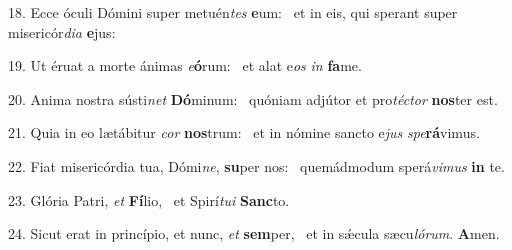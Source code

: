 18. Ecce óculi Dómini super metuén\textit{tes} \textbf{e}um: \ast\  et in eis, qui sperant super misericór\textit{di}\textit{a} \textbf{e}jus:\

19. Ut éruat a morte ánimas \textit{e}\textbf{ó}rum: \ast\  et alat e\textit{os} \textit{in} \textbf{fa}me.\

20. Anima nostra sústi\textit{net} \textbf{Dó}minum: \ast\  quóniam adjútor et pro\textit{téc}\textit{tor} \textbf{nos}ter est.\

21. Quia in eo lætábitur \textit{cor} \textbf{nos}trum: \ast\  et in nómine sancto e\textit{jus} \textit{spe}\textbf{rá}vimus.\

22. Fiat misericórdia tua, Dómi\textit{ne}, \textbf{su}per nos: \ast\  quemádmodum sperá\textit{vi}\textit{mus} \textbf{in} te.\

23. Glória Patri, \textit{et} \textbf{Fí}lio, \ast\  et Spirí\textit{tu}\textit{i} \textbf{Sanc}to.\

24. Sicut erat in princípio, et nunc, \textit{et} \textbf{sem}per, \ast\  et in sǽcula sæcu\textit{ló}\textit{rum}. \textbf{A}men.\

